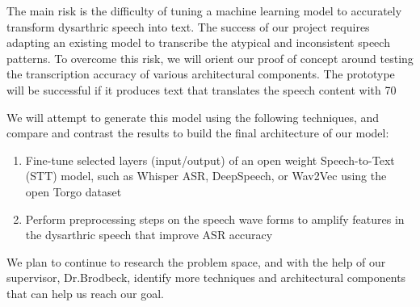 \documentclass{article}
\begin{document}
The main risk is the difficulty of tuning a machine learning model to accurately transform dysarthric speech into text. The success of our project requires adapting an existing model to transcribe the atypical and inconsistent speech patterns. To overcome this risk, we will orient our proof of concept around testing the transcription accuracy of various architectural components. The prototype will be successful if it produces text that translates the speech content with 70%

We will attempt to generate this model using the following techniques, and compare and contrast the results to build the final architecture of our model:
\begin{enumerate}
    \item Fine-tune selected layers (input/output) of an open weight Speech-to-Text (STT) model, such as Whisper ASR, DeepSpeech, or Wav2Vec using the open Torgo dataset
    \item Perform preprocessing steps on the speech wave forms to amplify features in the dysarthric speech that improve ASR accuracy 
\end{enumerate}


We plan to continue to research the problem space, and with the help of our supervisor, Dr.Brodbeck, identify more techniques and architectural components that can help us reach our goal.
\end{document}
